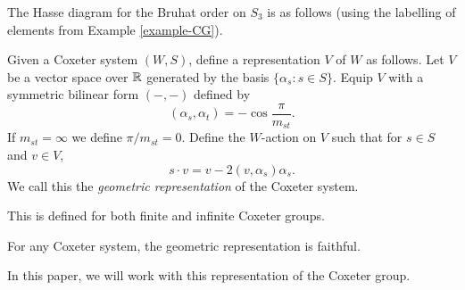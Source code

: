 
\begin{example}
    The Hasse diagram for the Bruhat order on $S_3$ is as follows (using the labelling of elements from Example \ref{example-CG}).
    \begin{center}
    \end{center}
\end{example}


\begin{definition}
    Given a Coxeter system $(W,S)$, define a representation $V$ of $W$ as follows. Let $V$ be a vector space over $\mathbb{R}$ generated by the basis $\{\alpha_s : s \in S\}$. Equip $V$ with a symmetric bilinear form $(-,-)$ defined by
    \[
        (\alpha_s, \alpha_t) = - \cos \frac{\pi}{m_{st}}.
    \]
    If $m_{st} = \infty$ we define $\pi/m_{st} = 0$. Define the $W$-action on $V$ such that for $s \in S$ and $v \in V$,
    \[
        s \cdot v = v - 2(v,\alpha_s) \alpha_s.
    \]
    We call this the \textit{geometric representation} of the Coxeter system.
\end{definition}

This is defined for both finite and infinite Coxeter groups.


\begin{proposition}
    For any Coxeter system, the geometric representation is faithful.
\end{proposition}


In this paper, we will work with this representation of the Coxeter group.


